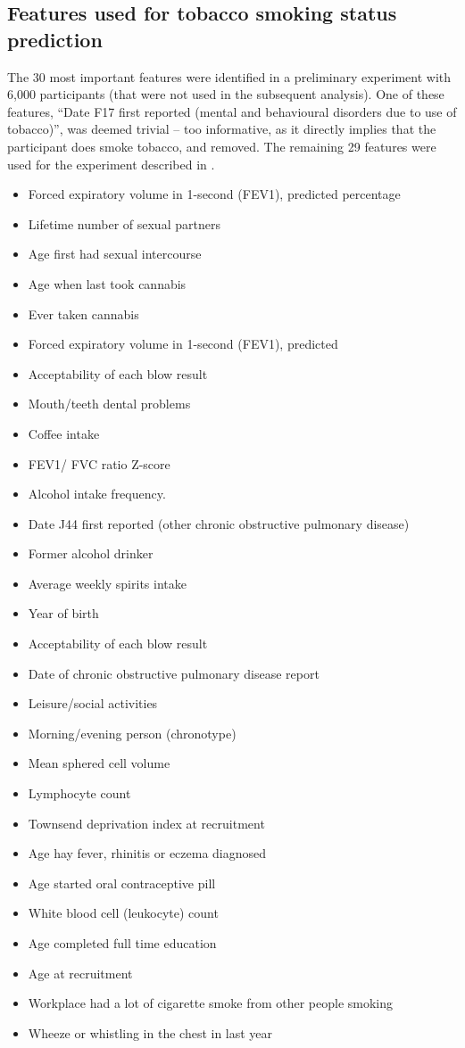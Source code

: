 \documentclass[twocolumn]{article}
\begin{document}
\subsection{Features used for tobacco smoking status prediction}
\label{sec:ukb-features}
The 30 most important features were identified in a preliminary experiment with 6,000 participants (that were not used in the subsequent analysis).
One of these features, ``Date F17 first reported (mental and behavioural disorders due to use of tobacco)'', was deemed trivial -- too informative, as it directly implies that the participant does smoke tobacco, and removed.
The remaining 29 features were used for the experiment described in .

\begin{itemize}
\item Forced expiratory volume in 1-second (FEV1), predicted percentage
\item Lifetime number of sexual partners
\item Age first had sexual intercourse
\item Age when last took cannabis
\item Ever taken cannabis
\item Forced expiratory volume in 1-second (FEV1), predicted
\item Acceptability of each blow result
\item Mouth/teeth dental problems
\item Coffee intake
\item FEV1/ FVC ratio Z-score
\item Alcohol intake frequency.
\item Date J44 first reported (other chronic obstructive pulmonary disease)
\item Former alcohol drinker
\item Average weekly spirits intake
\item Year of birth
\item Acceptability of each blow result
\item Date of chronic obstructive pulmonary disease report
\item Leisure/social activities
\item Morning/evening person (chronotype)
\item Mean sphered cell volume
\item Lymphocyte count
\item Townsend deprivation index at recruitment
\item Age hay fever, rhinitis or eczema diagnosed
\item Age started oral contraceptive pill
\item White blood cell (leukocyte) count
\item Age completed full time education
\item Age at recruitment
\item Workplace had a lot of cigarette smoke from other people smoking
\item Wheeze or whistling in the chest in last year
\end{itemize}
\end{document}
